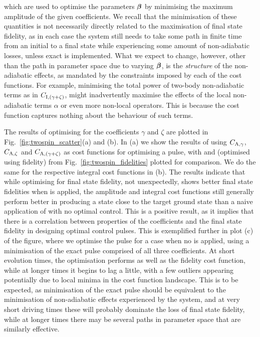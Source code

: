 which are used to optimise the parameters $\boldsymbol{\beta}$ by minimising the maximum amplitude of the given  coefficients. We recall that the minimisation of these quantities is not necessarily directly related to the maximisation of final state fidelity, as in each case the system still needs to take some path in finite time from an initial to a final state while experiencing some amount of non-adiabatic losses, unless exact  is implemented. What we expect to change, however, other than the path in parameter space due to varying $\boldsymbol{\beta}$, is the \emph{structure} of the non-adiabatic effects, as mandated by the constraints imposed by each of the cost functions. For example, minimising the total power of two-body non-adiabatic terms as in $C_{\rm I, (\gamma + \zeta)}$, might inadvertently maximise the effects of the local non-adiabatic terms $\alpha$ or even more non-local operators. This is because the cost function captures nothing about the behaviour of such terms.

The results of optimising for the   coefficients $\gamma$ and $\zeta$ are plotted in Fig.~\ref{fig:twospin_scatter}(a) and (b). In (a) we show the results of using $C_{\rm A, \gamma}$, $C_{\rm A, \zeta}$ and $C_{\rm A, (\gamma + \zeta)}$ as cost functions for optimising a   pulse, with   and   (optimised using fidelity) from Fig.~\ref{fig:twospin_fidelities} plotted for comparison. We do the same for the respective integral cost functions in (b). The results indicate that while optimising for final state fidelity, not unexpectedly, shows better final state fidelities when  is applied, the amplitude and integral cost functions still generally perform better in producing a state close to the target ground state than a naive application of   with no optimal control. This is a positive result, as it implies that there is a correlation between properties of the  coefficients and the final state fidelity in designing optimal control pulses. This is exemplified further in plot (c) of the figure, where we optimise the pulse for a case when no  is applied, using a minimisation of the exact  pulse comprised of all three  coefficients. At short evolution times, the optimisation performs as well as the fidelity cost function, while at longer times it begins to lag a little, with a few outliers appearing potentially due to local minima in the cost function landscape. This is to be expected, as minimisation of the exact  pulse should be equivalent to the minimisation of non-adiabatic effects experienced by the system, and at very short driving times these will probably dominate the loss of final state fidelity, while at longer times there may be several paths in parameter space that are similarly effective. 

